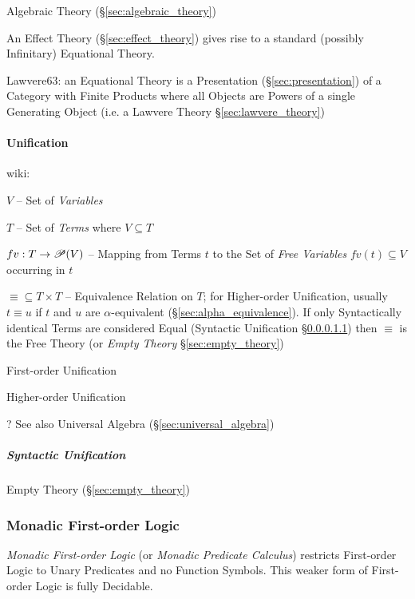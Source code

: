 Algebraic Theory (\S\ref{sec:algebraic_theory})

An Effect Theory (\S\ref{sec:effect_theory}) gives rise to a standard
(possibly Infinitary) Equational Theory. \cite{plotkin-pretnar09}

Lawvere63: an Equational Theory is a Presentation (\S\ref{sec:presentation}) of
a Category with Finite Products where all Objects are Powers of a single
Generating Object (i.e. a Lawvere Theory \S\ref{sec:lawvere_theory})



\paragraph{Unification}\label{sec:unification}\hfill

wiki:

$V$ -- Set of \emph{Variables}

$T$ -- Set of \emph{Terms} where $V \subseteq T$

$fv : T \rightarrow \mathscr{P}(V)$ -- Mapping from Terms $t$ to the Set of
\emph{Free Variables} $fv(t) \subseteq V$ occurring in $t$

$\equiv \subseteq T \times T$ -- Equivalence Relation on $T$; for
Higher-order Unification, usually $t \equiv u$ if $t$ and $u$ are
$\alpha$-equivalent (\S\ref{sec:alpha_equivalence}). If only
Syntactically identical Terms are considered Equal (Syntactic
Unification \S\ref{sec:syntactic_unification}) then $\equiv$ is the
Free Theory (or \emph{Empty Theory} \S\ref{sec:empty_theory})


First-order Unification

Higher-order Unification

\fist ? See also Universal Algebra (\S\ref{sec:universal_algebra})



\subparagraph{Syntactic Unification}\label{sec:syntactic_unification}
\hfill

Empty Theory (\S\ref{sec:empty_theory})



\subsubsection{Monadic First-order Logic}\label{sec:monadic_firstorder}

\emph{Monadic First-order Logic} (or \emph{Monadic Predicate
  Calculus}) restricts First-order Logic to Unary Predicates and no
Function Symbols. This weaker form of First-order Logic is fully
Decidable.



